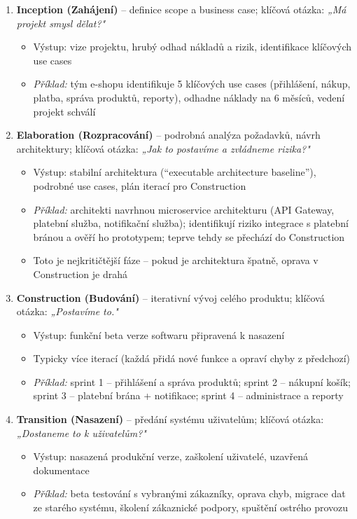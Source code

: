\begin{enumerate}
  \item \textbf{Inception (Zahájení)} -- definice scope a business case; klíčová otázka:
    \textit{„Má projekt smysl dělat?"}
    \begin{itemize}
      \item Výstup: vize projektu, hrubý odhad nákladů a rizik, identifikace klíčových use cases
      \item \textit{Příklad:} tým e-shopu identifikuje 5 klíčových use cases (přihlášení, nákup, platba,
        správa produktů, reporty), odhadne náklady na 6 měsíců, vedení projekt schválí
    \end{itemize}

  \item \textbf{Elaboration (Rozpracování)} -- podrobná analýza požadavků, návrh architektury;
    klíčová otázka: \textit{„Jak to postavíme a zvládneme rizika?"}
    \begin{itemize}
      \item Výstup: stabilní architektura (``executable architecture baseline''), podrobné use cases,
        plán iterací pro Construction
      \item \textit{Příklad:} architekti navrhnou microservice architekturu (API Gateway, platební
        služba, notifikační služba); identifikují riziko integrace s platební bránou a ověří ho
        prototypem; teprve tehdy se přechází do Construction
      \item Toto je nejkritičtější fáze -- pokud je architektura špatně, oprava v Construction je drahá
    \end{itemize}

  \item \textbf{Construction (Budování)} -- iterativní vývoj celého produktu;
    klíčová otázka: \textit{„Postavíme to."}
    \begin{itemize}
      \item Výstup: funkční beta verze softwaru připravená k nasazení
      \item Typicky více iterací (každá přidá nové funkce a opraví chyby z předchozí)
      \item \textit{Příklad:} sprint 1 -- přihlášení a správa produktů; sprint 2 -- nákupní košík;
        sprint 3 -- platební brána + notifikace; sprint 4 -- administrace a reporty
    \end{itemize}

  \item \textbf{Transition (Nasazení)} -- předání systému uživatelům; klíčová otázka:
    \textit{„Dostaneme to k uživatelům?"}
    \begin{itemize}
      \item Výstup: nasazená produkční verze, zaškolení uživatelé, uzavřená dokumentace
      \item \textit{Příklad:} beta testování s vybranými zákazníky, oprava chyb, migrace dat
        ze starého systému, školení zákaznické podpory, spuštění ostrého provozu
    \end{itemize}
\end{enumerate}


